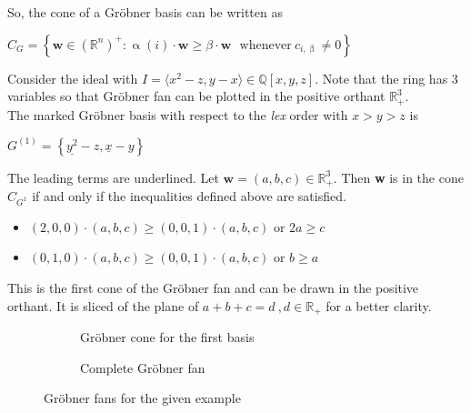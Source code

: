 So, the cone of a Gröbner basis can be written as \cite{coxOshea}\\
\begin{center}
$C_{G} = \left\lbrace \textbf{w} \in \left(\mathbb{R}^{n}\right)^{+} : \upalpha\left( i\right) \cdot \textbf{w} \geq \beta \cdot \textbf{w}~~~ \textrm{whenever}~ c_{i,\upbeta} \neq 0 \right\rbrace   $
\end{center}


\begin{env_example}\normalfont
\label{ex:groebnerfan}
Consider the ideal with $ I = \langle x^{2}-z,y-x \rangle \in \mathbb{Q}\left[ x,y,z\right] .$
Note that the ring has 3 variables so that Gröbner fan can be plotted in the positive orthant $ \mathbb{R}^{3}_{+}$. \\
The marked Gröbner basis with respect to the \textit{lex} order with $x>y>z$ is
\begin{center}
$G^{\left( 1\right) } = \left\lbrace \underline{y^{2}}-z,\underline{x} -y\right\rbrace $
\end{center}
The leading terms are underlined. Let $\textbf{w} = \left( a,b,c\right) \in \mathbb{R}^{3}_{+} $. Then \textbf{w} is in the cone $C_{G^{1}}$ if and only if the inequalities defined above are satisfied.

\begin{itemize}

\item
$\left( 2,0,0\right) \cdot \left( a,b,c\right) \geq \left( 0,0,1\right) \cdot \left( a,b,c\right) $ or $2a\geq c$ 
\item
$\left( 0,1,0\right) \cdot \left( a,b,c\right) \geq \left( 0,0,1\right) \cdot \left( a,b,c\right) $ or $b\geq a$ 

\end{itemize} 

This is the first cone of the Gröbner fan and can be drawn in the positive orthant. It is sliced of the plane of $a+b+c=d~,d\in \mathbb{R}_+$ for a better clarity.


\begin{figure}
    \centering
    \begin{subfigure}[b]{0.48\linewidth}        %
        \centering
        
        \caption{Gröbner cone for the first basis}
        \label{fig:singlegroebner}
    \end{subfigure}
    \begin{subfigure}[b]{0.48\linewidth}        %
        \centering
        
        \caption{Complete Gröbner fan}
        \label{fig:completegroebner}
    \end{subfigure}
    \caption{Gröbner fans for the given example}
    \label{fig:groebnerfans}
\end{figure}





\end{env_example}
